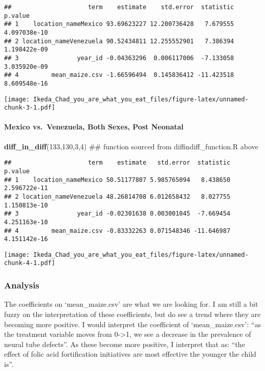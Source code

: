 \documentclass[]{article}
\newenvironment{Shaded}{\begin{snugshade}}{\end{snugshade}}
\newcommand{\KeywordTok}[1]{\textcolor[rgb]{0.13,0.29,0.53}{\textbf{#1}}}
\newcommand{\DecValTok}[1]{\textcolor[rgb]{0.00,0.00,0.81}{#1}}
\newcommand{\NormalTok}[1]{#1}
\let\oldparagraph\paragraph
\renewcommand{\paragraph}[1]{\oldparagraph{#1}\mbox{}}
\begin{document}
\begin{verbatim}
##                     term    estimate    std.error  statistic      p.value
## 1    location_nameMexico 93.69623227 12.200736428   7.679555 4.097038e-10
## 2 location_nameVenezuela 90.52434811 12.255552901   7.386394 1.198422e-09
## 3                year_id -0.04363296  0.006117006  -7.133058 3.035920e-09
## 4         mean_maize.csv -1.66596494  0.145836412 -11.423518 8.609548e-16
\end{verbatim}

\texttt{[image: Ikeda\_Chad\_you\_are\_what\_you\_eat\_files/figure-latex/unnamed-chunk-3-1.pdf]}

\paragraph{Mexico vs.~Venezuela, Both Sexes, Post
Neonatal}\label{mexico-vs.venezuela-both-sexes-post-neonatal}

\begin{Shaded}
\begin{Highlighting}[]
\KeywordTok{diff_in_diff}\NormalTok{(}\DecValTok{133}\NormalTok{,}\DecValTok{130}\NormalTok{,}\DecValTok{3}\NormalTok{,}\DecValTok{4}\NormalTok{) ## function sourced from diffindiff_function.R above}
\end{Highlighting}
\end{Shaded}

\begin{verbatim}
##                     term    estimate   std.error  statistic      p.value
## 1    location_nameMexico 50.51177807 5.985765094   8.438650 2.596722e-11
## 2 location_nameVenezuela 48.26814708 6.012658432   8.027755 1.150813e-10
## 3                year_id -0.02301638 0.003001045  -7.669454 4.251163e-10
## 4         mean_maize.csv -0.83332263 0.071548346 -11.646987 4.151142e-16
\end{verbatim}

\texttt{[image: Ikeda\_Chad\_you\_are\_what\_you\_eat\_files/figure-latex/unnamed-chunk-4-1.pdf]}

\subsubsection{Analysis}\label{analysis}

The coefficients on `mean\_maize.csv' are what we are looking for. I am
still a bit fuzzy on the interpretation of these coefficients, but do
see a trend where they are becoming more positive. I would interpret the
coefficient of `mean\_maize.csv': ``as the treatment variable moves from
0-\textgreater{}1, we see a decrease in the prevalence of neural tube
defects''. As these become more positive, I interpret that as: ``the
effect of folic acid fortification initiatives are most effective the
younger the child is''.
\end{document}
